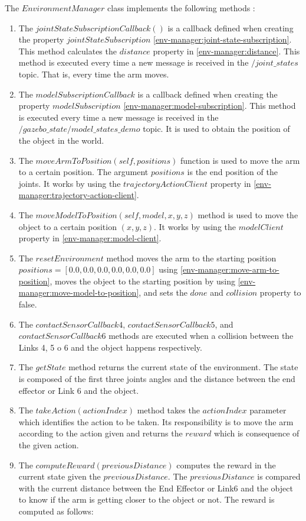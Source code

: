 \documentclass[12pt,oneside]{article}
\begin{document}
The $EnvironmentManager$ class implements the following methods :
\begin{enumerate}
\item The $jointStateSubscriptionCallback()$ is a callback defined when creating the property $jointStateSubscription$ \ref{env-manager:joint-state-subscription}. This method calculates the $distance$ property in \ref{env-manager:distance}. This method is executed every time a new message is received in the $/joint\_states$ topic. That is, every time the arm moves.
\item The $modelSubscriptionCallback$ is a callback defined when creating the property $modelSubscription$ \ref{env-manager:model-subscription}. This method is executed every time a new message is received in the $/gazebo\_state/model\_states\_demo$ topic. It is used to obtain the position of the object in the world.
\item\label{env-manager:move-arm-to-position} The $moveArmToPosition(self, positions)$ function is used to move the arm to a certain position. The argument $positions$ is the end position of the joints. It works by using the $trajectoryActionClient$ property in \ref{env-manager:trajectory-action-client}.
\item\label{env-manager:move-model-to-position} The $moveModelToPosition(self, model, x, y, z)$ method is used to move the object to a certain position $(x, y, z)$. It works by using the $modelClient$ property in \ref{env-manager:model-client}.
\item The $resetEnvironment$ method moves the arm to the starting position $positions = [0.0, 0.0, 0.0, 0.0, 0.0, 0.0]$ using \ref{env-manager:move-arm-to-position}, moves the object to the starting position by using \ref{env-manager:move-model-to-position}, and sets the $done$ and $collision$ property to false. 
\item The $contactSensorCallback4$, $contactSensorCallback5$, and $contactSensorCallback6$ methods are executed when a collision between the Links 4, 5 o 6 and the object happens respectively.
\item The $getState$ method returns the current state of the environment. The state is composed of the first three joints angles and the distance between the end effector or Link 6 and the object. 
\item The $takeAction(actionIndex)$ method takes the $actionIndex$ parameter which identifies the action to be taken. Its responsibility is to move the arm according to the action given and returns the $reward$ which is consequence of the given action.
\item The $computeReward(previousDistance)$ computes the reward in the current state given the $previousDistance$. The $previousDistance$ is compared with the current distance between the End Effector or Link6 and the object to know if the arm is getting closer to the object or not. The reward is computed as follows:\\


\end{enumerate}
\end{document}

